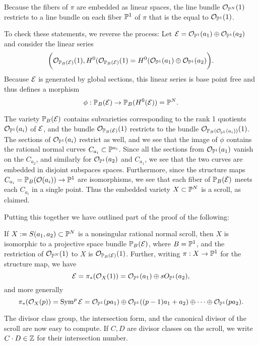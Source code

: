 Because the fibers of $\pi$ are embedded as linear spaces, the line bundle ${\mathcal O}_{{\mathbb P}^{N}}(1)$
restricts to a line bundle on each fiber ${\mathbb P}^{1}$ of $\pi$ that is the  equal to ${\mathcal O}_{{\mathbb P}^{1}}(1)$.

To check these statements, we reverse the process: Let 
${\mathcal E} =  {\mathcal O}_{{\mathbb P}^{1}}(a_{1}) \oplus {\mathcal O}_{{\mathbb P}^{1}}(a_{2})$
and consider the linear series  
$$
\biggl({\mathcal O}_{{\mathbb P}_B({\mathcal E})}(1), H^{0}({\mathcal O}_{{\mathbb P}_B({\mathcal E})}(1) = H^{0}({\mathcal O}_{{\mathbb P}^{1}}(a_{1}) \oplus {\mathcal O}_{{\mathbb P}^{1}}(a_{2})\biggr).
$$
Because ${\mathcal E}$ is generated by global sections, this linear series is base point free and thus defines
a morphism
$$
\phi:  {\mathbb P}_B({\mathcal E}) \to {\mathbb P}_B(H^{0}({\mathcal E})) = {\mathbb P}^{N}.
$$

The variety ${\mathbb P}_B({\mathcal E})$ contains subvarieties corresponding to the rank 1 quotients 
${\mathcal O}_{{\mathbb P}^{1}}(a_{i})$ of ${\mathcal E}$, and the bundle ${\mathcal O}_{{\mathbb P}_B({\mathcal E})}(1)$ restricts to
the bundle ${\mathcal O}_{{\mathbb P}_B({\mathcal O}_{{\mathbb P}^{1}}(a_{i}))}(1)$. The sections of ${\mathcal O}_{{\mathbb P}^{1}}(a_{i})$ restrict
as well, and we see that the image of $\phi$ contains the rational normal curves
$C_{a_{i}}\subset {\mathbb P}^{a_{i}}$. Since all the sections from ${\mathcal O}_{{\mathbb P}^{1}}(a_{1})$ vanish on the $C_{a_{2}}$, and similarly for ${\mathcal O}_{{\mathbb P}^{1}}(a_{2})$ and $C_{a_{1}}$, we see that the two curves are embedded in  disjoint subspaces spaces. Furthermore, since the structure maps $C_{a_{i}} = {\mathbb P}_{B}({\mathcal O}(a_{i})) \to {\mathbb P}^{1}$ are
isomorphisms, we see that each
 fiber of ${\mathbb P}_B({\mathcal E})$ meets each $C_{a_{i}}$ in a single point. Thus the embedded
 variety $X\subset {\mathbb P}^{N}$ is a scroll, as claimed.


Putting this together we have outlined part of the proof of the following:

\begin{fact}\label{push-forward formula}
 If $X := S(a_{1}, a_{2})\subset {\mathbb P}^{N}$ is a nonsingular rational normal scroll, then
 $X$ is isomorphic to a projective space bundle ${\mathbb P}_{B}({\mathcal E})$, where $B = {\mathbb P}^{1}$, and the restriction of ${\mathcal O}_{{\mathbb P}^{N}}(1)$ to $X$
 is ${\mathcal O}_{{\mathbb P}_B({\mathcal E})}(1)$. Further, writing $\pi: X\to {\mathbb P}^{1}$ for the structure map, we have
$$
{\mathcal E} = \pi_{*}({\mathcal O}_{X}(1)) = {\mathcal O}_{{\mathbb P}^{1}}(a_{1}) \oplus sO_{{\mathbb P}^{1}}(a_{2}),
$$
and more generally 
$$
\pi_{*}({\mathcal O}_{X}(p)) = \operatorname{Sym}^{p}{\mathcal E} = {\mathcal O}_{{\mathbb P}^{1}}(pa_{1}) \oplus {\mathcal O}_{{\mathbb P}^{1}}((p-1)a_{1}+a_{2})
\oplus \cdots\oplus {\mathcal O}_{{\mathbb P}^{1}}(pa_{2}).
$$
\end{fact}


 The divisor class group, the intersection form, and the canonical divisor of the scroll are now easy to compute. If $C,D$ are divisor classes on the scroll, we write $C\cdot D\in {\mathbb Z}$ for their intersection number.
 

